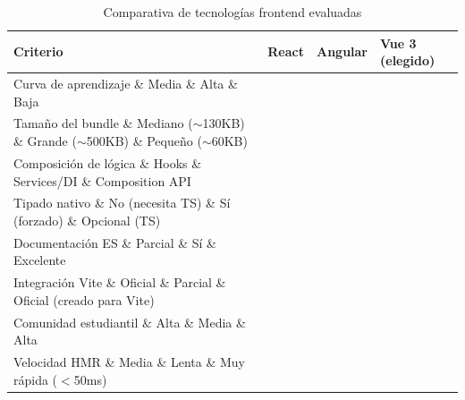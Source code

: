 \documentclass[11pt,a4paper]{article}
\begin{document}
\begin{table}[htbp]
\centering
\small
\caption{Comparativa de tecnologías frontend evaluadas}
\begin{tabularx}{\textwidth}{lXXX}
\toprule
\textbf{Criterio} & \textbf{React} & \textbf{Angular} & \textbf{Vue 3 (elegido)} \\
\midrule
Curva de aprendizaje \& Media \& Alta \& Baja \\
Tamaño del bundle \& Mediano ($\sim$130KB) \& Grande ($\sim$500KB) \& Pequeño ($\sim$60KB) \\
Composición de lógica \& Hooks \& Services/DI \& Composition API \\
Tipado nativo \& No (necesita TS) \& Sí (forzado) \& Opcional (TS) \\
Documentación ES \& Parcial \& Sí \& Excelente \\
Integración Vite \& Oficial \& Parcial \& Oficial (creado para Vite) \\
Comunidad estudiantil \& Alta \& Media \& Alta \\
Velocidad HMR \& Media \& Lenta \& Muy rápida ($<$50ms) \\
\bottomrule
\end{tabularx}
\end{table}
\end{document}
